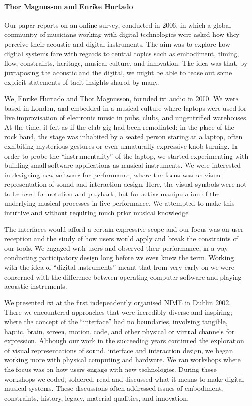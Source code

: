 \paragraph{Thor Magnusson and Enrike Hurtado}

Our paper reports on an online survey, conducted in 2006, in which a global community of musicians working with digital technologies were asked how they perceive their acoustic and digital instruments. The aim was to explore how digital systems fare with regards to central topics such as embodiment, timing, flow, constraints, heritage, musical culture, and innovation. The idea was that, by juxtaposing the acoustic and the digital, we might be able to tease out some explicit statements of tacit insights shared by many.

We, Enrike Hurtado and Thor Magnusson, founded ixi audio in 2000. We were based in London, and embedded in a musical culture where laptops were used for live improvisation of electronic music in pubs, clubs, and ungentrified warehouses. At the time, it felt as if the club-gig had been remediated: in the place of the rock band, the stage was inhabited by a seated person staring at a laptop, often exhibiting mysterious gestures or even unnaturally expressive knob-turning. In order to probe the ``instrumentality'' of the laptop, we started experimenting with building small software applications as musical instruments. We were interested in designing new software for performance, where the focus was on visual representation of sound and interaction design. Here, the visual symbols were not to be used for notation and playback, but for active manipulation of the underlying musical processes in live performance. We attempted to make this intuitive and without requiring much prior musical knowledge.

The interfaces would afford a certain expressive scope and our focus was on user reception and the study of how users would apply and break the constraints of our tools. \cite{Magnusson:2010} We engaged with users and observed their performance, in a way conducting participatory design long before we even knew the term. Working with the idea of ``digital instruments'' meant that from very early on we were concerned with the difference between operating computer software and playing acoustic instruments.

We presented ixi at the first independently organised NIME in Dublin 2002. There we encountered approaches that were incredibly diverse and inspiring; where the concept of the ``interface'' had no boundaries, involving tangible, haptic, brain, screen, motion, code, and other physical or virtual channels for expression. Although our work in the succeeding years continued the exploration of visual representations of sound, interface and interaction design, we began working more with physical computing and hardware. We ran workshops where the focus was on how users engage with new technologies. During these workshops we coded, soldered, read and discussed what it means to make digital musical systems. These discussions often addressed issues of embodiment, constraints, history, legacy, material qualities, and innovation. 

